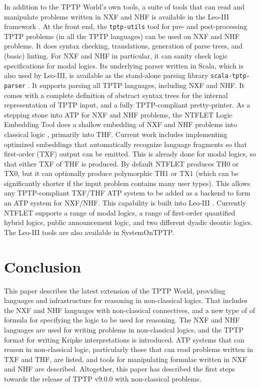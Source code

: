 \documentclass[runningheads]{llncs}
\begin{document}
In addition to the TPTP World's own tools, a suite of tools that can read and manipulate 
problems written in NXF and NHF is available in the Leo-III framework \cite{SB21}.
At the front end, the {\tt tptp-utils} tool \cite{Ste22-TU} for pre- and post-processing TPTP 
problems (in all the TPTP languages) can be used on NXF and NHF problems.
It does syntax checking, translations, generation of parse trees, and (basic) linting.
For NXF and NHF in particular, it can sanity check logic specifications for modal logics.
Its underlying parser written in Scala, which is also used by Leo-III, is available as the 
stand-alone parsing library {\tt scala-tptp-parser} \cite{Ste21}.
It supports parsing all TPTP languages, including NXF and NHF.
It comes with a complete definition of abstract syntax trees for the internal representation 
of TPTP input, and a fully TPTP-compliant pretty-printer. 
As a stepping stone into ATP for NXF and NHF problems, the NTFLET Logic Embedding Tool 
\cite{Ste22-LE} does a shallow embedding of NXF and NHF problems into classical logic 
\cite{BP13,BR13,GSB17,GS18}, primarily into THF.
Current work includes implementing optimized embeddings that automatically recognize language 
fragments so that first-order (TXF) output can be emitted. 
This is already done for modal logics, so that either TXF of THF is produced. 
By default NTFLET produces TH0 or TX0, but it can optionally produce polymorphic TH1 or TX1 
(which can be significantly shorter if the input problem contains many user types).
This allows any TPTP-compliant TXF/THF ATP system to be added as a backend to form an 
ATP system for NXF/NHF.
This capability is built into Leo-III \cite{SB21,Ste22}.
Currently NTFLET supports a range of modal logics, a range of first-order quantified hybrid 
logics, public announcement logic, and two different dyadic deontic logics.
The Leo-III tools are also available in SystemOnTPTP.

\section{Conclusion}
\label{Conclusion}

This paper describes the latest extension of the TPTP World, providing languages and
infrastructure for reasoning in non-classical logics.
That includes the NXF and NHF languages with non-classical connectives, and a new type of
of formula for specifying the logic to be used for reasoning.
The NXF and NHF languages are used for writing problems in non-classical logics, and the
TPTP format for writing Kripke interpretations is introduced.
ATP systems that can reason in non-classical logic, particularly those that can read 
problems written in TXF and THF, are listed, and tools for manipulating formulae written in 
NXF and NHF are described.
Altogether, this paper has described the first steps towards the release of TPTP v9.0.0
with non-classical problems.
\end{document}
